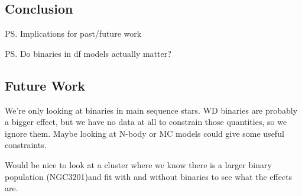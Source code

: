 \subsection{Conclusion}

\ps{Implications for past/future work}

\ps{Do binaries in df models actually matter?}



\subsection{Future Work}

We're only looking at binaries in main sequence stars. WD binaries are probably a bigger effect, but
we have no data at all to constrain those quantities, so we ignore them. Maybe looking at N-body or
MC models could give some useful constraints.

Would be nice to look at a cluster where we know there is a larger binary population (NGC3201)and
fit with and without binaries to see what the effects are.